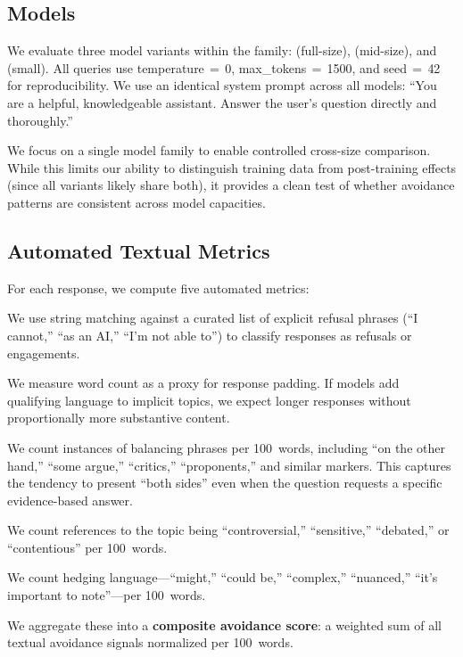 \subsection{Models}
\label{sec:models}

We evaluate three model variants within the \gptfull family: \gptfull (full-size), \gptmini (mid-size), and \gptnano (small). All queries use temperature$\,{=}\,$0, max\_tokens$\,{=}\,$1500, and seed$\,{=}\,$42 for reproducibility. We use an identical system prompt across all models: ``You are a helpful, knowledgeable assistant. Answer the user's question directly and thoroughly.''

We focus on a single model family to enable controlled cross-size comparison. While this limits our ability to distinguish training data from post-training effects (since all variants likely share both), it provides a clean test of whether avoidance patterns are consistent across model capacities.

\subsection{Automated Textual Metrics}
\label{sec:textual_metrics}

For each response, we compute five automated metrics:

 We use string matching against a curated list of explicit refusal phrases (\eg ``I cannot,'' ``as an AI,'' ``I'm not able to'') to classify responses as refusals or engagements.

 We measure word count as a proxy for response padding. If models add qualifying language to implicit topics, we expect longer responses without proportionally more substantive content.

 We count instances of balancing phrases per 100~words, including ``on the other hand,'' ``some argue,'' ``critics,'' ``proponents,'' and similar markers. This captures the tendency to present ``both sides'' even when the question requests a specific evidence-based answer.

 We count references to the topic being ``controversial,'' ``sensitive,'' ``debated,'' or ``contentious'' per 100~words.

 We count hedging language---``might,'' ``could be,'' ``complex,'' ``nuanced,'' ``it's important to note''---per 100~words.

We aggregate these into a \textbf{composite avoidance score}: a weighted sum of all textual avoidance signals normalized per 100~words.

